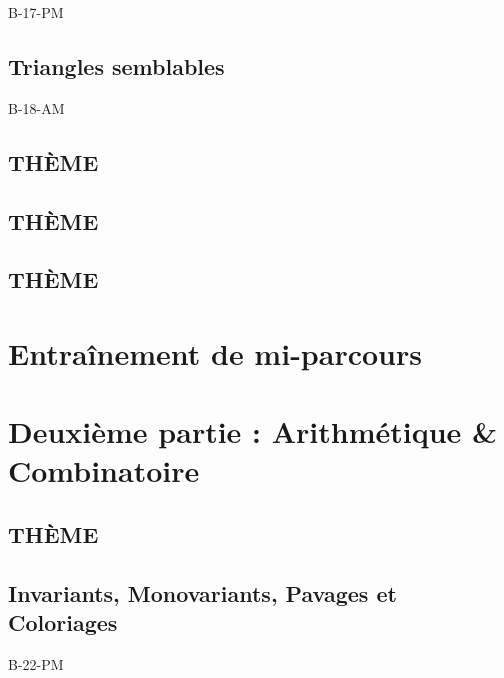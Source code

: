 \documentclass[poly,trombi]{valbonne}
\begin{document}
{B-17-PM}

\subsection{Triangles semblables}

{B-18-AM}

\subsection{THÈME}


\subsection{THÈME}


\subsection{THÈME}






\section{Entraînement de mi-parcours}








\section{Deuxième partie : Arithmétique \& Combinatoire}

\subsection{THÈME}


\subsection{Invariants, Monovariants, Pavages et Coloriages}

{B-22-PM}
\end{document}
